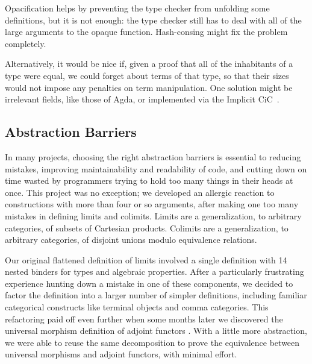     Opacification helps by preventing the type checker from unfolding some definitions, but it is not enough: the type checker still has to deal with all of the large arguments to the opaque function.
    Hash-consing might fix the problem completely.

    Alternatively, it would be nice if, given a proof that all of the inhabitants of a type were equal, we could forget about terms of that type, so that their sizes would not impose any penalties on term manipulation.  %
    One solution might be irrelevant fields, like those of Agda, or implemented via the Implicit CiC~\cite{barras2008implicit,logical2001implicit}.

  \subsection{Abstraction Barriers} \label{sec:abstraction-barriers}

    In many projects, choosing the right abstraction barriers is essential to reducing mistakes, improving maintainability and readability of code, and cutting down on time wasted by programmers trying to hold too many things in their heads at once.
    This project was no exception; we developed an allergic reaction to constructions with more than four or so arguments, after making one too many mistakes in defining limits and colimits.
    Limits are a generalization, to arbitrary categories, of subsets of Cartesian products.
    Colimits are a generalization, to arbitrary categories, of disjoint unions modulo equivalence relations.

    Our original flattened definition of limits involved a single definition with 14 nested binders for types and algebraic properties.
    After a particularly frustrating experience hunting down a mistake in one of these components, we decided to factor the definition into a larger number of simpler definitions, including familiar categorical constructs like terminal objects and comma categories.
    This refactoring paid off even further when some months later we discovered the universal morphism definition of adjoint functors%
    .
    With a little more abstraction, we were able to reuse the same decomposition to prove the equivalence between universal morphisms and adjoint functors, with minimal effort.

